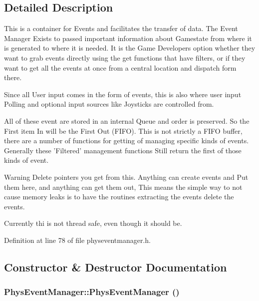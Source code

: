 \subsection{Detailed Description}
This is a container for Events and facilitates the transfer of data. The Event Manager Exists to passed important information about Gamestate from where it is generated to where it is needed. It is the Game Developers option whether they want to grab events directly using the get functions that have filters, or if they want to get all the events at once from a central location and dispatch form there. \par
 Since all User input comes in the form of events, this is also where user input Polling and optional input sources like Joysticks are controlled from. \par
 All of these event are stored in an internal Queue and order is preserved. So the First item In will be the First Out (FIFO). This is not strictly a FIFO buffer, there are a number of functions for getting of managing specific kinds of events. Generally these 'Filtered' management functions Still return the first of those kinds of event. \begin{DoxyWarning}{Warning}
Delete pointers you get from this. Anything can create events and Put them here, and anything can get them out, This means the simple way to not cause memory leaks is to have the routines extracting the events delete the events. 

Currently thi is not thread safe, even though it should be. 
\end{DoxyWarning}


Definition at line 78 of file physeventmanager.h.

\subsection{Constructor \& Destructor Documentation}
\hypertarget{classPhysEventManager_a217e7f6006aaf5e08e2872fa4d66e5e2}{
\subsubsection[{PhysEventManager}]{\setlength{\rightskip}{0pt plus 5cm}PhysEventManager::PhysEventManager ()}}
\label{d5/dd7/classPhysEventManager_a217e7f6006aaf5e08e2872fa4d66e5e2}


